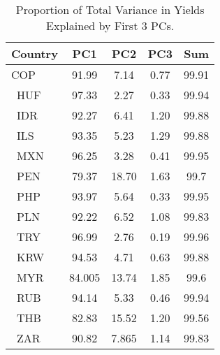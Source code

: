 \begin{table}
	\centering
	\begin{tabular}{lcccc}
		\toprule
		\textbf{Country}&\textbf{PC1}&\textbf{PC2}&\textbf{PC3}&\textbf{Sum}\\\midrule
		{ COP}&91.99& 7.14& 0.77&99.91\\\
		HUF&97.33& 2.27&  0.33&99.94\\\
		IDR&92.27&  6.41& 1.20&99.88\\\
		ILS&93.35&  5.23& 1.29&99.88\\\
		MXN&96.25& 3.28& 0.41&99.95\\\
		PEN&79.37&18.70& 1.63&99.7\\\
		PHP&93.97&5.64&0.33&99.95\\\
		PLN&92.22& 6.52& 1.08&99.83\\\
		TRY&96.99& 2.76& 0.19&99.96\\\
		KRW&94.53& 4.71& 0.63&99.88\\\
		MYR&84.005&13.74& 1.85&99.6\\\
		RUB&94.14& 5.33&0.46&99.94\\\
		THB&82.83& 15.52& 1.20&99.56\\\
		ZAR&90.82& 7.865&  1.14&99.83\\ \bottomrule
	\end{tabular}
	\\
	\caption{Proportion of Total Variance in Yields Explained by First 3 PCs.}
	\label{tab:pc_explained}
\end{table}
